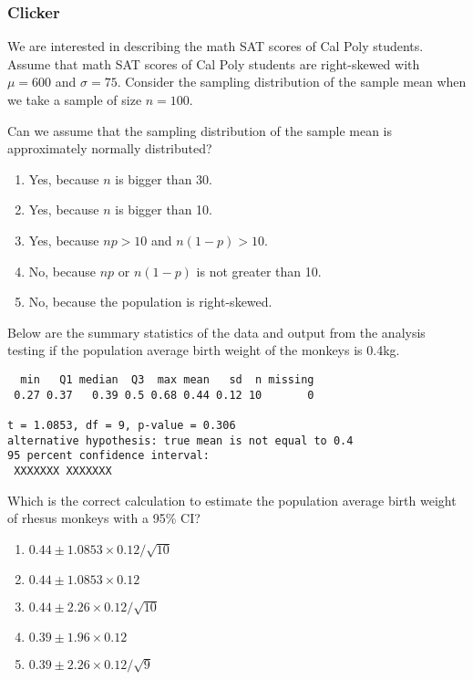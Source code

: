 \begin{frame}
\frametitle{Clicker}
We are interested in describing the math SAT scores of Cal Poly students.  Assume that math SAT scores of Cal Poly students are right-skewed with $\mu=600$ and $\sigma=75$.  Consider the sampling distribution of the sample mean when we take a sample of size $n=100$.
\begin{clicker}
{Can we assume that the sampling distribution of the sample mean is approximately normally distributed?}
    \begin{enumerate}
        \item
        Yes, because $n$ is bigger than 30.
        \item
        Yes, because $n$ is bigger than 10.
        \item
        Yes, because $np>10$ and $n(1-p)>10$.
        \item
        No, because $np$ or $n(1-p)$ is not greater than 10.
        \item
        No, because the population is right-skewed.
    \end{enumerate}
\end{clicker}
\end{frame}

\begin{frame}[fragile]
\small{Below are the summary statistics of the data and output from the analysis testing if the population average birth weight of the monkeys is 0.4kg.}
\begin{verbatim}
  min   Q1 median  Q3  max mean   sd  n missing
 0.27 0.37   0.39 0.5 0.68 0.44 0.12 10       0

t = 1.0853, df = 9, p-value = 0.306
alternative hypothesis: true mean is not equal to 0.4
95 percent confidence interval:
 XXXXXXX XXXXXXX
\end{verbatim}
\begin{clicker}{Which is the correct calculation to estimate the population average birth weight of rhesus monkeys with a 95\% CI?}
\begin{enumerate}
\item	$0.44 \pm 1.0853 \times 0.12 / \sqrt{10} $
\item	$0.44 \pm 1.0853 \times 0.12  $
\item	$0.44 \pm 2.26 \times 0.12 / \sqrt{10} $
\item	$0.39 \pm 1.96 \times 0.12 $
\item  $0.39 \pm 2.26 \times 0.12 / \sqrt{9} $
\end{enumerate}
\end{clicker}
\end{frame}

